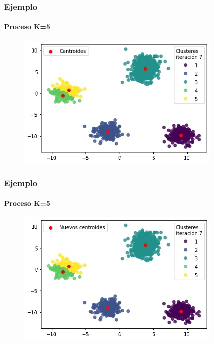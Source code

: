 \documentclass[
  shownotes,
  xcolor={svgnames},
  hyperref={colorlinks,citecolor=DarkBlue,linkcolor=DarkRed,urlcolor=DarkBlue}
  , aspectratio=169]{beamer}
\begin{document}
\begin{frame}
\frametitle{Ejemplo}
\framesubtitle{Proceso K=5}


\begin{figure}[H] \centering

    \centering
    \includegraphics[scale=.7]{figures/k5_11.jpg}
  \\
  \tiny
\end{figure}


\end{frame}
\begin{frame}
\frametitle{Ejemplo}
\framesubtitle{Proceso K=5}


\begin{figure}[H] \centering

    \centering
    \includegraphics[scale=.7]{figures/k5_12.jpg}
  \\
  \tiny
\end{figure}


\end{frame}
\end{document}
